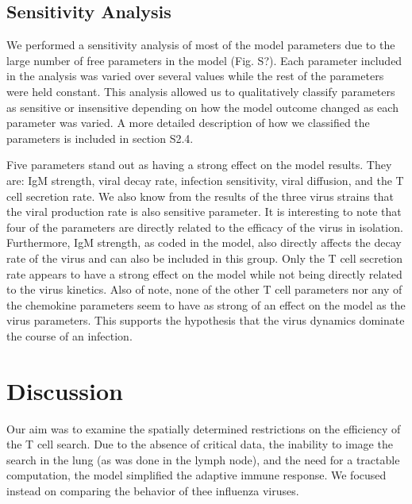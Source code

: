 \documentclass[10pt]{article}
\begin{document}


\subsection*{Sensitivity Analysis}

We performed a sensitivity analysis of most of the model parameters due to the large number of free parameters in the model (Fig. S?).  Each parameter included in the analysis was varied over several values while the rest of the parameters were held constant.  This analysis allowed us to qualitatively classify parameters as sensitive or insensitive depending on how the model outcome changed as each parameter was varied.  A more detailed description of how we classified the parameters is included in section S2.4.

Five parameters stand out as having a strong effect on the model results.  They are: IgM strength, viral decay rate, infection sensitivity, viral diffusion, and the T cell secretion rate.  We also know from the results of the three virus strains that the viral production rate is also sensitive parameter.  It is interesting to note that four of the parameters are directly related to the efficacy of the virus in isolation.  Furthermore, IgM strength, as coded in the model, also directly affects the decay rate of the virus and can also be included in this group.  Only the T cell secretion rate appears to have a strong effect on the model while not being directly related to the virus kinetics.  Also of note, none of the other T cell parameters nor any of the chemokine parameters seem to have as strong of an effect on the model as the virus parameters.  This supports the hypothesis that the virus dynamics dominate the course of an infection.  


\section*{Discussion}

Our aim was to examine the spatially determined restrictions on the efficiency of the T cell search.  Due to the absence of critical data, the inability to image the search in the lung (as was done in the lymph node), and the need for a tractable computation, the model simplified the adaptive immune response.  We focused instead on comparing the behavior of thee influenza viruses.
\end{document}

